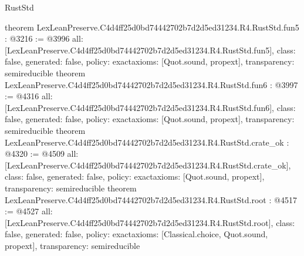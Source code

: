 \begin{lexlean}{RustStd}
\begin{coremodule}
{}
theorem LexLeanPreserve.C4d4ff25d0bd74442702b7d2d5ed31234.R4.RustStd.fun5 : @3216 := @3996 {
  all: [LexLeanPreserve.C4d4ff25d0bd74442702b7d2d5ed31234.R4.RustStd.fun5],
  class: false,
  generated: false,
  policy: exact{axioms: [Quot.sound, propext]},
  transparency: semireducible
}
theorem LexLeanPreserve.C4d4ff25d0bd74442702b7d2d5ed31234.R4.RustStd.fun6 : @3997 := @4316 {
  all: [LexLeanPreserve.C4d4ff25d0bd74442702b7d2d5ed31234.R4.RustStd.fun6],
  class: false,
  generated: false,
  policy: exact{axioms: [Quot.sound, propext]},
  transparency: semireducible
}
theorem LexLeanPreserve.C4d4ff25d0bd74442702b7d2d5ed31234.R4.RustStd.crate_ok : @4320 := @4509 {
  all: [LexLeanPreserve.C4d4ff25d0bd74442702b7d2d5ed31234.R4.RustStd.crate_ok],
  class: false,
  generated: false,
  policy: exact{axioms: [Quot.sound, propext]},
  transparency: semireducible
}
theorem LexLeanPreserve.C4d4ff25d0bd74442702b7d2d5ed31234.R4.RustStd.root : @4517 := @4527 {
  all: [LexLeanPreserve.C4d4ff25d0bd74442702b7d2d5ed31234.R4.RustStd.root],
  class: false,
  generated: false,
  policy: exact{axioms: [Classical.choice, Quot.sound, propext]},
  transparency: semireducible
}


\end{coremodule}
\end{lexlean}
